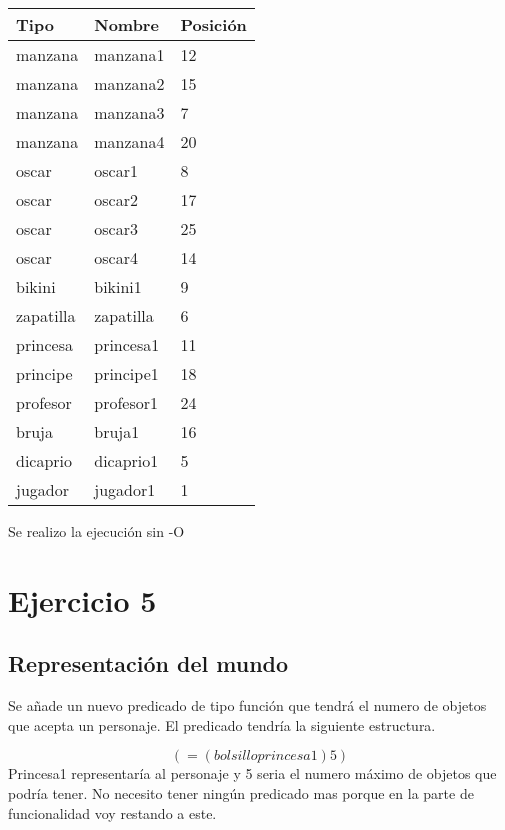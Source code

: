 \documentclass[]{article}
\begin{document}
\begin{table}[H]
	\begin{center}
		\begin{tabular}{|l|l|l|}
			\hline
			Tipo & Nombre & Posición \\
			\hline \hline
			manzana & manzana1& 12 \\ \hline
			manzana & manzana2 & 15\\ \hline
			manzana & manzana3 & 7\\ \hline
			manzana & manzana4 & 20 \\ \hline
			oscar & oscar1 & 8\\ \hline
			oscar & oscar2 & 17\\ \hline
			oscar & oscar3 & 25\\ \hline
			oscar & oscar4 & 14\\ \hline
			bikini & bikini1 & 9\\ \hline
			zapatilla & zapatilla & 6\\ \hline 
			princesa & princesa1 & 11 \\ \hline
			principe & principe1 & 18 \\ \hline
			profesor & profesor1 & 24  \\ \hline
			bruja & bruja1 & 16 \\ \hline
			dicaprio  & dicaprio1& 5 \\ \hline
			jugador & jugador1 & 1 \\ \hline
			
		\end{tabular}
	\end{center}
\end{table}


Se realizo la ejecución sin -O
	
\section{Ejercicio 5}
\subsection{Representación del mundo}
Se añade un nuevo predicado de tipo función que tendrá el numero de objetos que acepta un personaje. El predicado tendría la siguiente estructura.

$$
(= (bolsillo princesa1) 5)
$$
Princesa1 representaría al personaje y 5 seria el numero máximo de objetos que podría tener. No necesito tener ningún predicado mas porque en la parte de funcionalidad voy restando a este.
\end{document}

